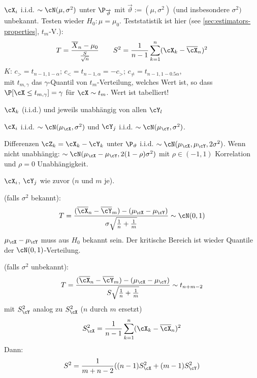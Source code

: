 \shortexample[t-Test] $\cX_i$ i.i.d. $\sim \cN(\mu, \sigma^2)$ unter $\P_{\overrightarrow{\vartheta}}$
mit $\overrightarrow{\vartheta} := (\mu, \sigma^2)$ (und insbesondere $\sigma^2)$ unbekannt.
Testen wieder $H_0 : \mu = \mu_0$. Teststatistik ist hier (see \ref{sec:estimators-properties}, $t_m$-V.):
\[
    T = \frac{\overline{X}_n - \mu_0}{\frac{S}{\sqrt{n}}} \qquad S^2 = \frac{1}{n - 1} \sum_{k = 1}^{n} (\cX_k - \overline{\cX}_n)^2
\]
$K$: $c_> = t_{n - 1, 1 - \alpha}$; $c_< = t_{n - 1, \alpha} = -c_>$; $c_{\neq} = t_{n - 1, 1 - 0.5 \alpha}$,\\
mit $t_{m, \gamma}$ das $\gamma$-Quantil von $t_m$-Verteilung, welches Wert ist, so dass $\P[\cX \leq t_{m, \gamma}] = \gamma$ für $\cX \sim t_m$.
Wert ist tabelliert!


 $\cX_k$ (i.i.d.) und jeweils unabhängig von allen $\cY_l$


 $\cX_i$ i.i.d. $\sim \cN(\mu_\cX, \sigma^2)$ und $\cY_j$ i.i.d. $\sim \cN(\mu_\cY, \sigma^2)$.

Differenzen $\cZ_k = \cX_k - \cY_k$ unter $\P_\vartheta$ i.i.d. $\sim \cN(\mu_\cX, \mu_\cY, 2\sigma^2)$.
Wenn nicht unabhängig: $\sim \cN(\mu_\cX - \mu_\cY, 2(1 - \rho) \sigma^2)$ mit $\rho \in (-1, 1)$ Korrelation und $\rho = 0$ Unabhängigkeit.


\shortexample[Ungepaart] $\cX_i$, $\cY_j$ wie zuvor ($n$ und $m$ je).

 (falls $\sigma^2$ bekannt):
\[
    T = \frac{(\overline{\cX}_n - \overline{\cY}_m) - (\mu_\cX - \mu_\cY)}{\sigma \sqrt{\frac{1}{n} + \frac{1}{m}}} \sim \cN(0, 1)
\]
$\mu_\cX - \mu_\cY$ muss aus $H_0$ bekannt sein. Der kritische Bereich ist wieder Quantile der $\cN(0, 1)$-Verteilung.

 (falls $\sigma^2$ unbekannt):
\[
    T = \frac{(\overline{\cX}_n - \overline{\cY}_m) - (\mu_\cX - \mu_\cY)}{S \sqrt{\frac{1}{n} + \frac{1}{m}}} \sim t_{n + m - 2}
\]
mit $S^2_\cY$ analog zu $S^2_\cX$ ($n$ durch $m$ ersetzt)
\[
    S^2_\cX = \frac{1}{n - 1} \sum_{k = 1}^{n} (\cX_k - \overline{\cX}_n)^2
\]
Dann:
\[
    S^2 = \frac{1}{m + n - 2}((n - 1)S_\cX^2 + (m - 1)S_\cY^2)
\]
